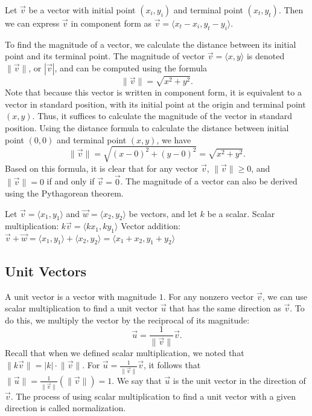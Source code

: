 \documentclass{report}
\begin{document}
    \begin{thrmm}
        Let $\vec{v}$ be a vector with initial point $(x_i, y_i)$ and terminal point $(x_t, y_t)$. Then we can express $\vec{v}$ in component form as $\vec{v} = \langle x_t - x_i, y_t - y_i \rangle.$
    \end{thrmm}
    \bigbreak \noindent 
    To find the magnitude of a vector, we calculate the distance between its initial point and its terminal point. The magnitude of vector $\vec{v} = \langle x, y \rangle$ is denoted $\lVert \vec{v} \rVert$, or $|\vec{v}|$, and can be computed using the formula
    \[
        \lVert \vec{v} \rVert = \sqrt{x^2 + y^2}.
    \]
    Note that because this vector is written in component form, it is equivalent to a vector in standard position, with its initial point at the origin and terminal point $(x, y)$. Thus, it suffices to calculate the magnitude of the vector in standard position. Using the distance formula to calculate the distance between initial point $(0,0)$ and terminal point $(x, y)$, we have
    \[
        \lVert \vec{v} \rVert = \sqrt{(x - 0)^2 + (y - 0)^2} = \sqrt{x^2 + y^2}.
    \]
    Based on this formula, it is clear that for any vector $\vec{v}$, $\lVert \vec{v} \rVert \geq 0$, and $\lVert \vec{v} \rVert = 0$ if and only if $\vec{v} = \vec{0}$.
    \bigbreak \noindent 
    The magnitude of a vector can also be derived using the Pythagorean theorem.
    \pagebreak \bigbreak \noindent 
    \begin{dfn}
        Let $\vec{v} = \langle x_1, y_1 \rangle$ and $\vec{w} = \langle x_2, y_2 \rangle$ be vectors, and let $k$ be a scalar.
        \bigbreak \noindent 
        Scalar multiplication: $k\vec{v} = \langle kx_1, ky_1 \rangle$
        \bigbreak \noindent 
        Vector addition: $\vec{v} + \vec{w} = \langle x_1, y_1 \rangle + \langle x_2, y_2 \rangle = \langle x_1 + x_2, y_1 + y_2 \rangle$
    \end{dfn}
    \bigbreak \noindent 
    \subsection{Unit Vectors}
    \bigbreak \noindent 
    A unit vector is a vector with magnitude $1$. For any nonzero vector $\vec{v}$, we can use scalar multiplication to find a unit vector $\vec{u}$ that has the same direction as $\vec{v}$. To do this, we multiply the vector by the reciprocal of its magnitude:
    \[
    \vec{u} = \frac{1}{\lVert \vec{v} \rVert} \vec{v}.
    \]
    Recall that when we defined scalar multiplication, we noted that $\lVert k\vec{v} \rVert = |k| \cdot \lVert \vec{v} \rVert$. For $\vec{u} = \frac{1}{\lVert \vec{v} \rVert} \vec{v}$, it follows that $\lVert \vec{u} \rVert = \frac{1}{\lVert \vec{v} \rVert} (\lVert \vec{v} \rVert) = 1$. We say that $\vec{u}$ is the unit vector in the direction of $\vec{v}$. The process of using scalar multiplication to find a unit vector with a given direction is called normalization.
\end{document}
